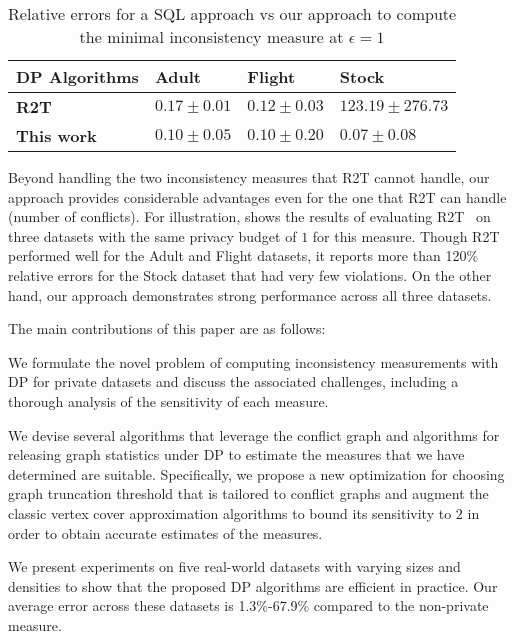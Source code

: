 \begin{table}
\centering
\begin{tabular}{|l|l|l|l|}
\hline
\textbf{DP Algorithms} & \textbf{Adult~\cite{misc_adult_2}}                  & \textbf{Flight~\cite{flight}}                 & \textbf{Stock~\cite{oleh_onyshchak_2020}}                  \\ \hline
\textbf{R2T~\cite{dong2022r2t}}           & $0.17\pm 0.01$ & $0.12\pm0.03$ & $123.19\pm 276.73$    \\ \hline
\textbf{This work}  & $0.10 \pm 0.05$ & $0.10 \pm 0.20$  & $0.07\pm 0.08$ \\ \hline
\end{tabular}
  \caption{Relative errors for a SQL approach vs our approach to compute the minimal inconsistency measure at $\epsilon=1$} \label{tab:intro_comparison}
\end{table}

Beyond handling the two inconsistency measures that R2T cannot handle, our approach provides considerable advantages even for the one that R2T can handle (number of conflicts). 
For illustration,  shows the results of evaluating R2T~\cite{dong2022r2t} on three datasets with the same privacy budget of $1$ for this measure. Though R2T performed well for the Adult and Flight datasets, it reports more than 120\% relative errors for the Stock dataset that had very few violations. 
On the other hand, our approach demonstrates strong performance across all three datasets.


The main contributions of this paper are as follows: 
\squishlist
    \item We formulate the novel problem of computing inconsistency measurements with DP for private datasets and discuss the associated challenges, including a thorough analysis of the sensitivity of each measure.
    \item We devise several algorithms that leverage the conflict graph and algorithms for releasing graph statistics under DP to estimate the measures that we have determined are suitable. Specifically, we propose a new optimization for choosing graph truncation threshold that is tailored to conflict graphs and augment the classic vertex cover approximation algorithms to bound its sensitivity to $2$ in order to obtain accurate estimates of the measures. 
    \item We present experiments on five real-world datasets with varying sizes and densities to show that the proposed DP algorithms are efficient in practice. Our average error across these datasets is 1.3\%-67.9\% compared to the non-private measure.
\squishend

